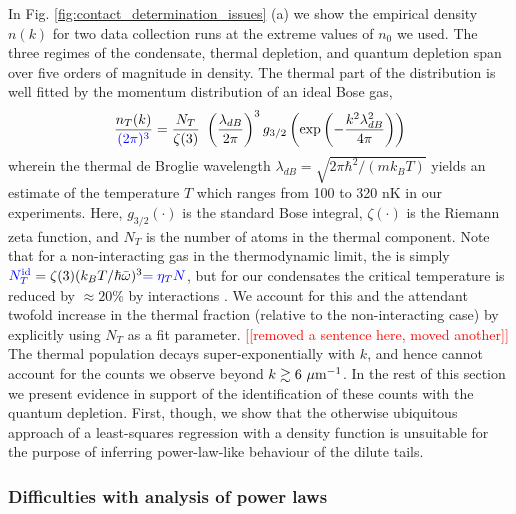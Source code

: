 	In Fig. \ref{fig:contact_determination_issues} (a) we show the empirical density $n(k)$ for two data collection runs at the extreme values of $n_0$ we used. The three regimes of the condensate, thermal depletion, and quantum depletion span over five orders of magnitude in density. The thermal part of the distribution is well fitted by the momentum distribution of an ideal Bose gas,
	\begin{equation}
		\frac{n_T(k)}{{\color{blue}{(2\pi)^3}}} =\frac{N_T}{\zeta(3)} ~\left(\frac{\lambda_{dB}}{2\pi}\right)^3 g_{3/2}\left(\exp\left(-\frac{k^2 \lambda_{dB}^2}{4\pi}\right)\right)
		\label{eqn:th_fun}
	\end{equation}
	wherein the thermal de Broglie wavelength $\lambda_{dB} = \sqrt{2\pi\hbar^2/(m k_B T)}$ yields an estimate of the temperature $T$ which ranges from 100 to 320 nK in our experiments. Here, $g_{3/2}(\cdot)$ is the standard Bose integral, $\zeta(\cdot)$ is the Riemann zeta function, and $N_T$ is the number of atoms in the thermal component. 
	Note that for a non-interacting gas in the thermodynamic limit, the  %
	is simply ${\color{blue}{N_T^{\rm id}}} = \zeta(3)(k_B T / \hbar\bar{\omega})^3{\color{blue}{=\eta_T N}}$, but for our condensates the critical temperature is reduced by $\approx20\%$ by interactions \cite{PitaevskiiStringari,PethickSmith}. 
	We account for this and the attendant twofold increase in the thermal fraction   (relative to the non-interacting case) by explicitly using $N_T$ as a fit parameter.
	\textcolor{red}{[[removed a sentence here, moved another]]} %
	The thermal population decays super-exponentially with $k$, and hence cannot account for the counts we observe beyond $k\gtrsim 6~\mu\textrm{m}^{-1}$. %
	In the rest of this section we present evidence in support of the identification of these counts with the quantum depletion. 
	First, though, we show that the otherwise ubiquitous approach of a least-squares regression with a density function is unsuitable for the purpose of inferring power-law-like behaviour of the dilute tails.

\subsubsection{Difficulties with analysis of power laws}	
\label{sec:pow_issues}

